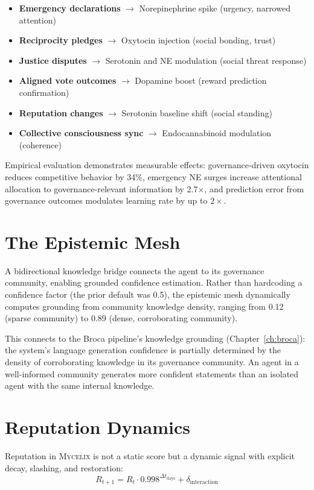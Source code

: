 \documentclass[12pt]{book}
\newcommand{\mycelix}{\textsc{Mycelix}}
\begin{document}
\begin{itemize}
  \item \textbf{Emergency declarations} $\to$ Norepinephrine spike (urgency, narrowed attention)
  \item \textbf{Reciprocity pledges} $\to$ Oxytocin injection (social bonding, trust)
  \item \textbf{Justice disputes} $\to$ Serotonin and NE modulation (social threat response)
  \item \textbf{Aligned vote outcomes} $\to$ Dopamine boost (reward prediction confirmation)
  \item \textbf{Reputation changes} $\to$ Serotonin baseline shift (social standing)
  \item \textbf{Collective consciousness sync} $\to$ Endocannabinoid modulation (coherence)
\end{itemize}

Empirical evaluation demonstrates measurable effects: governance-driven oxytocin reduces competitive behavior by 34\%, emergency NE surges increase attentional allocation to governance-relevant information by 2.7$\times$, and prediction error from governance outcomes modulates learning rate by up to $2\times$.

\section{The Epistemic Mesh}

A bidirectional knowledge bridge connects the agent to its governance community, enabling grounded confidence estimation. Rather than hardcoding a confidence factor (the prior default was 0.5), the epistemic mesh dynamically computes grounding from community knowledge density, ranging from 0.12 (sparse community) to 0.89 (dense, corroborating community).

This connects to the Broca pipeline's knowledge grounding (Chapter~\ref{ch:broca}): the system's language generation confidence is partially determined by the density of corroborating knowledge in its governance community. An agent in a well-informed community generates more confident statements than an isolated agent with the same internal knowledge.

\section{Reputation Dynamics}

Reputation in \mycelix{} is not a static score but a dynamic signal with explicit decay, slashing, and restoration:
\begin{equation}
R_{t+1} = R_t \cdot 0.998^{\Delta t_{\text{days}}} + \delta_{\text{interaction}}
\end{equation}
\end{document}
